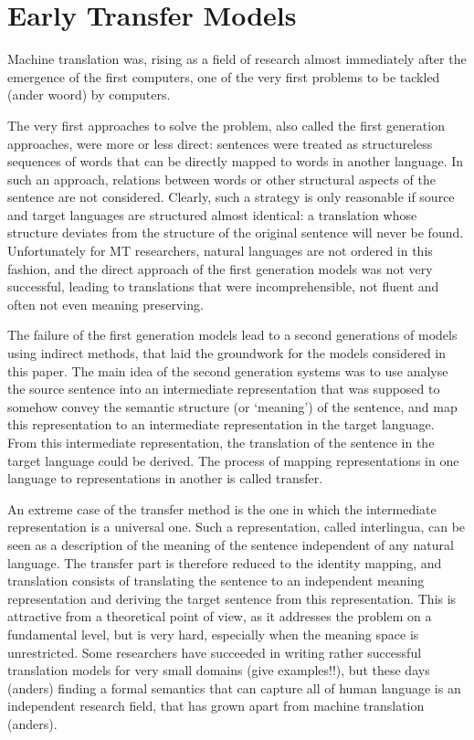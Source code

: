 \documentclass{report}
\theoremstyle{definition}
\theoremstyle{plain}
\begin{document}
\section{Early Transfer Models}
Machine translation was, rising as a field of research almost immediately after the emergence of the first computers, one of the very first problems to be tackled (ander woord) by computers.

The very first approaches to solve the problem, also called the first generation approaches, were more or less direct: sentences were treated as structureless sequences of words that can be directly mapped to words in another language. In such an approach, relations between words or other structural aspects of the sentence are not considered. Clearly, such a strategy is only reasonable if source and target languages are structured almost identical: a translation whose structure deviates from the structure of the original sentence will never be found. Unfortunately for MT researchers, natural languages are not ordered in this fashion, and the direct approach of the first generation models was not very successful, leading to translations that were incomprehensible, not fluent and often not even meaning preserving.

The failure of the first generation models lead to a second generations of models using indirect methods, that laid the groundwork for the models considered in this paper. The main idea of the second generation systems was to use analyse the source sentence into an intermediate representation that was supposed to somehow convey the semantic structure (or `meaning') of the sentence, and map this representation to an intermediate representation in the target language. From this intermediate representation, the translation of the sentence in the target language could be derived. The process of mapping representations in one language to representations in another is called transfer.

An extreme case of the transfer method is the one in which the intermediate representation is a universal one. Such a representation, called interlingua, can be seen as a description of the meaning of the sentence independent of any natural language. The transfer part is therefore reduced to the identity mapping, and translation consists of translating the sentence to an independent meaning representation and deriving the target sentence from this representation. This is attractive from a theoretical point of view, as it addresses the problem on a fundamental level, but is very hard, especially when the meaning space is unrestricted. Some researchers have succeeded in writing rather successful translation models for very small domains (give examples!!), but these days (anders) finding a formal semantics that can capture all of human language is an independent research field, that has grown apart from machine translation (anders).
\end{document}
